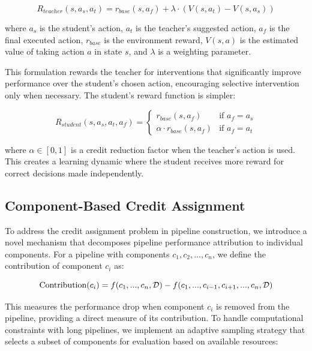 \documentclass[twoside,11pt]{article}
\newcommand{\dataset}{{\cal D}}
\begin{document}
\begin{equation}
R_{teacher}(s, a_s, a_t) = r_{base}(s, a_f) + \lambda \cdot (V(s, a_t) - V(s, a_s))
\end{equation}

where $a_s$ is the student's action, $a_t$ is the teacher's suggested action, $a_f$ is the final executed action, $r_{base}$ is the environment reward, $V(s, a)$ is the estimated value of taking action $a$ in state $s$, and $\lambda$ is a weighting parameter.

This formulation rewards the teacher for interventions that significantly improve performance over the student's chosen action, encouraging selective intervention only when necessary. The student's reward function is simpler:

\begin{equation}
R_{student}(s, a_s, a_t, a_f) = 
\begin{cases}
r_{base}(s, a_f) & \text{if } a_f = a_s \\
\alpha \cdot r_{base}(s, a_f) & \text{if } a_f = a_t
\end{cases}
\end{equation}

where $\alpha \in [0, 1]$ is a credit reduction factor when the teacher's action is used. This creates a learning dynamic where the student receives more reward for correct decisions made independently.

\subsection{Component-Based Credit Assignment}

To address the credit assignment problem in pipeline construction, we introduce a novel mechanism that decomposes pipeline performance attribution to individual components. For a pipeline with components $c_1, c_2, ..., c_n$, we define the contribution of component $c_i$ as:

\begin{equation}
\text{Contribution}(c_i) = f(c_1, ..., c_n, \dataset) - f(c_1, ..., c_{i-1}, c_{i+1}, ..., c_n, \dataset)
\end{equation}

This measures the performance drop when component $c_i$ is removed from the pipeline, providing a direct measure of its contribution. To handle computational constraints with long pipelines, we implement an adaptive sampling strategy that selects a subset of components for evaluation based on available resources:
\end{document}

